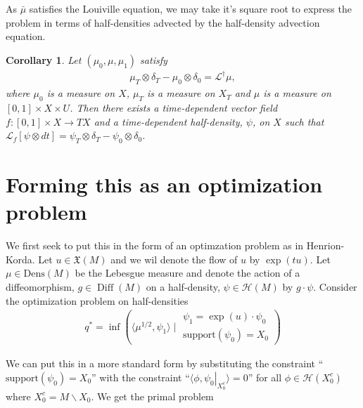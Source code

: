 \documentclass[12pt]{amsart}
\DeclareMathOperator{\Diff}{Diff}
\newtheorem{cor}{Corollary}
\begin{document}
As $\bar{\mu}$ satisfies the Louiville equation, we may take it's square root to express the problem in terms of half-densities advected by the half-density advection equation.

\begin{cor}
  Let $(\mu_0,\mu,\mu_1)$ satisfy
  \begin{align*}
    \mu_T \otimes \delta_T - \mu_0 \otimes \delta_0 = \mathcal{L}^\dagger \mu,
  \end{align*}
  where $\mu_0$ is a measure on $X$, $\mu_T$ is a measure on $X_T$ and $\mu$ is a measure on $[0,1] \times X \times U$.
  Then there exists a time-dependent vector field $f:[0,1] \times X \to TX$
and a time-dependent half-density, $\psi$, on $X$ such that $\mathcal{L}_f [ \psi \otimes dt ] = \psi_T \otimes \delta_T - \psi_0 \otimes \delta_0$.
\end{cor}



\section{Forming this as an optimization problem}

We first seek to put this in the form of an optimzation problem as in Henrion-Korda.  Let $u \in \mathfrak{X}(M)$ and we wil denote the flow of $u$ by $\exp(t u)$.  Let $\mu \in \mathrm{Dens}(M)$ be the Lebesgue measure and denote the action of a diffeomorphism, $g \in \Diff(M)$ on a half-density, $\psi \in \mathcal{H}(M)$ by $g \cdot \psi$.  Consider the optimization problem on half-densities
\begin{align*}
  q^* = \inf  \left( \langle \mu^{1/2} , \psi_1 \rangle \mid 
    \begin{array}{l}
      \psi_1 = \exp (u) \cdot \psi_0 \\
      \mathrm{support}(\psi_0) = X_0
    \end{array}
  \right)
\end{align*}

We can put this in a more standard form by substituting the constraint 
``$\mathrm{support}(\psi_0) = X_0$'' with the constraint
``$\langle \phi , \left. \psi_0 \right|_{X_0^c} \rangle = 0$'' for all
$\phi \in \mathcal{H}( X_0^c )$ where $X_0^c = M \backslash X_0$.  We get the primal problem
\end{document}
